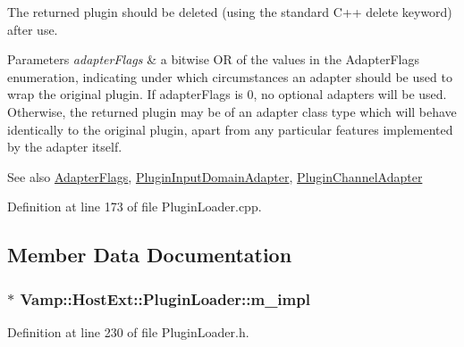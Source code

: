 The returned plugin should be deleted (using the standard C++ delete keyword) after use.


\begin{DoxyParams}{Parameters}
{\em adapter\+Flags} & a bitwise OR of the values in the Adapter\+Flags enumeration, indicating under which circumstances an adapter should be used to wrap the original plugin. If adapter\+Flags is 0, no optional adapters will be used. Otherwise, the returned plugin may be of an adapter class type which will behave identically to the original plugin, apart from any particular features implemented by the adapter itself.\\
\hline
\end{DoxyParams}
\begin{DoxySeeAlso}{See also}
\hyperlink{class_vamp_1_1_host_ext_1_1_plugin_loader_aff3ee11692ce25e0dfb904324cbe3494}{Adapter\+Flags}, \hyperlink{class_vamp_1_1_host_ext_1_1_plugin_input_domain_adapter}{Plugin\+Input\+Domain\+Adapter}, \hyperlink{class_vamp_1_1_host_ext_1_1_plugin_channel_adapter}{Plugin\+Channel\+Adapter} 
\end{DoxySeeAlso}


Definition at line 173 of file Plugin\+Loader.\+cpp.



\subsection{Member Data Documentation}
\subsubsection[{\texorpdfstring{m\+\_\+impl}{m_impl}}]{$\ast$ Vamp\+::\+Host\+Ext\+::\+Plugin\+Loader\+::m\+\_\+impl\hspace{0.3cm}{\ttfamily [protected]}}\hypertarget{class_vamp_1_1_host_ext_1_1_plugin_loader_ac12254d823f6d63cb8ce82a07bdcb072}{}\label{class_vamp_1_1_host_ext_1_1_plugin_loader_ac12254d823f6d63cb8ce82a07bdcb072}


Definition at line 230 of file Plugin\+Loader.\+h.

